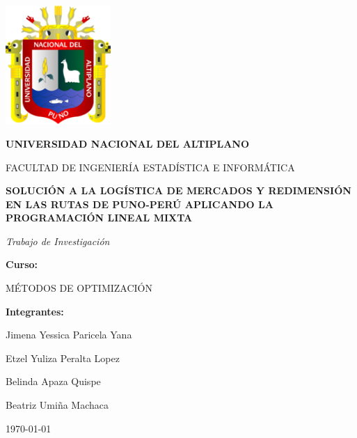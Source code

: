 \documentclass[11pt, a4paper]{article}
\begin{document}
\begin{titlepage}
    \centering
    \vspace*{1cm}
    {\includegraphics[width=0.3\textwidth]{LOGO.png}\par}
    \vspace{1.5cm}
    {\LARGE\bfseries\color{maincolor} UNIVERSIDAD NACIONAL DEL ALTIPLANO\par}
    \vspace{0.5cm}
    {\large FACULTAD DE INGENIERÍA ESTADÍSTICA E INFORMÁTICA\par}
    \vspace{1.5cm}
    {\Huge\bfseries\color{maincolor} SOLUCIÓN A LA LOGÍSTICA DE MERCADOS Y REDIMENSIÓN EN LAS RUTAS DE PUNO-PERÚ APLICANDO LA PROGRAMACIÓN LINEAL MIXTA\par}
    \vspace{1.5cm}
    {\Large\itshape Trabajo de Investigación\par}
    \vspace{1.0cm}
    {\large\bfseries Curso: \par}
    {\large MÉTODOS DE OPTIMIZACIÓN\par}
    {\large\bfseries Integrantes: \par}
    {\large Jimena Yessica Paricela Yana\par}
    {\large Etzel Yuliza Peralta Lopez \par}
    {\large Belinda Apaza Quispe\par}
    {\large Beatriz Umiña Machaca \par}
    \vfill
    {\large \today\par}
\end{titlepage}

\thispagestyle{fancy} %

\begin{abstract}
\noindent Los problemas de asignación de recursos escasos a tareas competitivas pueden resolverse eficientemente mediante procedimientos de programación lineal mixta. Estos procedimientos son apropiados siempre que las variables del problema estén relacionadas linealmente entre sí. Sus aplicaciones han sido extensas en la industria y algunas veces han proporcionado ahorros notables \citep{Hillier2010}. Aunque la programación lineal no es la única forma de optimizar las utilidades para un sistema dado, muchas de las relaciones fundamentales entre variables incitan a su utilización, especialmente en problemas de distribución y logística como el que se aborda en este trabajo \citep{Taha2017}.
\end{abstract}
\end{document}
